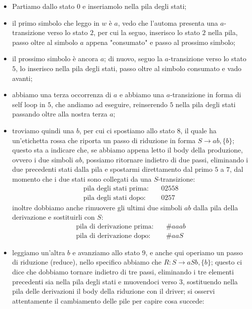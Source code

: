 \documentclass[class=book, crop=false, oneside, 12pt]{standalone}
\begin{document}
\begin{itemize}
    \item Partiamo dallo stato \(0\) e inseriamolo nella pila degli stati;
    \item il primo simbolo che leggo in \(w\) è \(a\), vedo che l'automa presenta una \(a\)-transizione verso lo stato \(2\), per cui la seguo, inserisco lo stato \(2\) nella pila, passo oltre al simbolo \(a\) appena "consumato" e passo al prossimo simbolo;
    \item il prossimo simbolo è ancora \(a\); di nuovo, seguo la \(a\)-transizione verso lo stato \(5\), lo inserisco nella pila degli stati, passo oltre al simbolo consumato e vado avanti;
    \item abbiamo una terza occorrenza di \(a\) e abbiamo una \(a\)-transizione in forma di self loop in \(5\), che andiamo ad eseguire, reinserendo \(5\) nella pila degli stati passando oltre alla nostra terza \(a\);
    \item troviamo quindi una \(b\), per cui ci spostiamo allo stato \(8\), il quale ha un'etichetta rossa che riporta un passo di riduzione in forma \(S \to ab, \{b\}\); questo sta a indicare che, se abbiamo appena letto il body della produzione, ovvero i due simboli \(ab\), possiamo ritornare indietro di due passi, eliminando i due precedenti stati dalla pila e spostarmi direttamento dal primo \(5\) a \(7\), dal momento che i due stati sono collegati da una \(S\)-transizione:
    \begin{align*}
        \textrm{pila degli stati prima:} &\quad 02558 \\
        \textrm{pila degli stati dopo:} &\quad 0257 
    \end{align*}
    inoltre dobbiamo anche rimuovere gli ultimi due simboli \(ab\) dalla pila della derivazione e sostituirli con \(S\):
    \begin{align*}
        \textrm{pila di derivazione prima:} &\quad \#aaab \\
        \textrm{pila di derivazione dopo:} &\quad \#aaS 
    \end{align*}
    \item leggiamo un'altra \(b\) e avanziamo allo stato \(9\), e anche qui operiamo un passo di riduzione (reduce), nello specifico abbiamo che \(R: S \to aSb, \{b\}\); questo ci dice che dobbiamo tornare indietro di tre passi, eliminando i tre elementi precedenti sia nella pila degli stati e muovendoci verso \(3\), sostituendo nella pila delle derivazioni il body della riduzione con il driver; si osservi attentamente il cambiamento delle pile per capire cosa succede:

\end{itemize}
\end{document}
